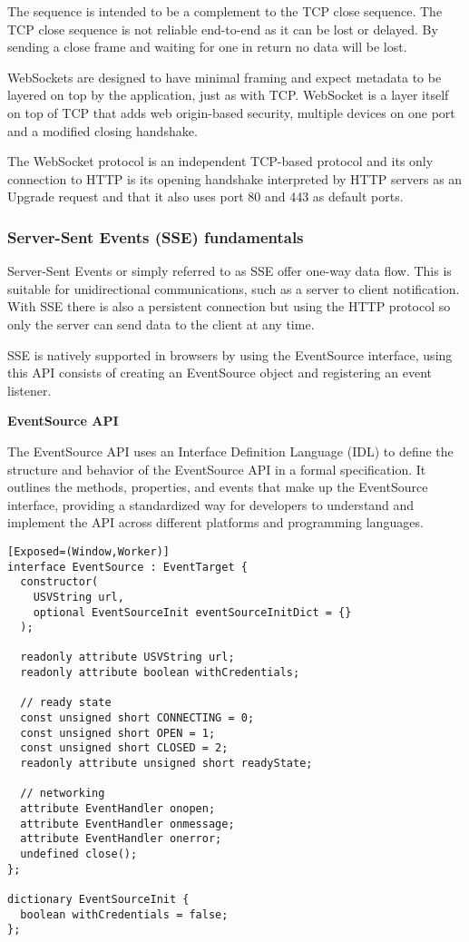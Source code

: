 The sequence is intended to be a complement to the TCP close sequence. The TCP close sequence is not reliable end-to-end as it can be lost or delayed. By sending a close frame and waiting for one in return no data will be lost.

WebSockets are designed to have minimal framing and expect metadata to be layered on top by the application, just as with TCP. WebSocket is a layer itself on top of TCP that adds web origin-based security, multiple devices on one port and a modified closing handshake.

The WebSocket protocol is an independent TCP-based protocol and its only connection to HTTP is its opening handshake interpreted by HTTP servers as an Upgrade request and that it also uses port 80 and 443 as default ports. \cite{ws-rfc}

\subsubsection{Server-Sent Events (SSE) fundamentals}

Server-Sent Events or simply referred to as SSE offer one-way data flow. This is suitable for unidirectional communications, such as a server to client notification. With SSE there is also a persistent connection but using the HTTP protocol so only the server can send data to the client at any time.

SSE is natively supported in browsers by using the EventSource interface, using this API consists of creating an EventSource object and registering an event listener. \cite{html-spec-sse}

\textbf{EventSource API}

The EventSource API uses an Interface Definition Language (IDL) to define the structure and behavior of the EventSource API in a formal specification. It outlines the methods, properties, and events that make up the EventSource interface, providing a standardized way for developers to understand and implement the API across different platforms and programming languages. \cite{html-spec-sse}

\begin{lstlisting}[caption=EventSource API IDL]
[Exposed=(Window,Worker)]
interface EventSource : EventTarget {
  constructor(
    USVString url,
    optional EventSourceInit eventSourceInitDict = {}
  );

  readonly attribute USVString url;
  readonly attribute boolean withCredentials;

  // ready state
  const unsigned short CONNECTING = 0;
  const unsigned short OPEN = 1;
  const unsigned short CLOSED = 2;
  readonly attribute unsigned short readyState;

  // networking
  attribute EventHandler onopen;
  attribute EventHandler onmessage;
  attribute EventHandler onerror;
  undefined close();
};

dictionary EventSourceInit {
  boolean withCredentials = false;
};
\end{lstlisting}

